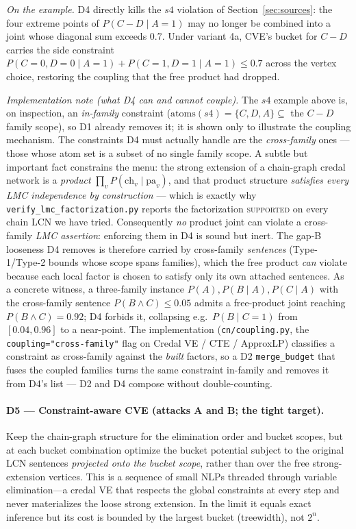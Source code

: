 \documentclass[11pt]{article}
\begin{document}
\smallskip\noindent\emph{On the example.} D4 directly kills the $s4$ violation of
Section~\ref{sec:sources}: the four extreme points of $P(C\!-\!D\mid A{=}1)$ may no longer
be combined into a joint whose diagonal sum exceeds $0.7$. Under variant 4a, CVE's bucket
for $C\!-\!D$ carries the side constraint
$P(C{=}0,D{=}0\mid A{=}1)+P(C{=}1,D{=}1\mid A{=}1)\le0.7$ across the vertex choice,
restoring the coupling that the free product had dropped.

\smallskip\noindent\emph{Implementation note (what D4 can and cannot couple).} The
$s4$ example above is, on inspection, an \emph{in-family} constraint ($\mathrm{atoms}(s4)=
\{C,D,A\}\subseteq$ the $C\!-\!D$ family scope), so D1 already removes it; it is shown only
to illustrate the coupling mechanism. The constraints D4 must actually handle are the
\emph{cross-family} ones --- those whose atom set is a subset of no single family scope.
A subtle but important fact constrains the menu: the strong extension of a chain-graph
credal network is a \emph{product} $\prod_v P(\mathrm{ch}_v\mid\mathrm{pa}_v)$, and that
product structure \emph{satisfies every LMC independence by construction} --- which is
exactly why \texttt{verify\_lmc\_factorization.py} reports the factorization
\textsc{supported} on every chain LCN we have tried. Consequently \emph{no} product joint
can violate a cross-family \emph{LMC assertion}: enforcing them in D4 is sound but inert.
The gap-B looseness D4 removes is therefore carried by cross-family \emph{sentences}
(Type-1/Type-2 bounds whose scope spans families), which the free product \emph{can}
violate because each local factor is chosen to satisfy only its own attached sentences. As
a concrete witness, a three-family instance $P(A),P(B\mid A),P(C\mid A)$ with the
cross-family sentence $P(B\land C)\le 0.05$ admits a free-product joint reaching
$P(B\land C)=0.92$; D4 forbids it, collapsing e.g.\ $P(B\mid C{=}1)$ from $[0.04,0.96]$ to a
near-point. The implementation (\texttt{cn/coupling.py}, the \texttt{coupling="cross-family"}
flag on Credal VE / CTE / ApproxLP) classifies a constraint as cross-family against the
\emph{built} factors, so a D2 \texttt{merge\_budget} that fuses the coupled families turns
the same constraint in-family and removes it from D4's list --- D2 and D4 compose without
double-counting.

\paragraph{D5 --- Constraint-aware CVE (attacks A and B; the tight target).}
Keep the chain-graph structure for the elimination order and bucket scopes, but at each
bucket combination optimize the bucket potential subject to the original LCN sentences
\emph{projected onto the bucket scope}, rather than over the free strong-extension vertices.
This is a sequence of small NLPs threaded through variable elimination---a credal VE that
respects the global constraints at every step and never materializes the loose strong
extension. In the limit it equals exact inference but its cost is bounded by the largest
bucket (treewidth), not $2^n$.
\end{document}
